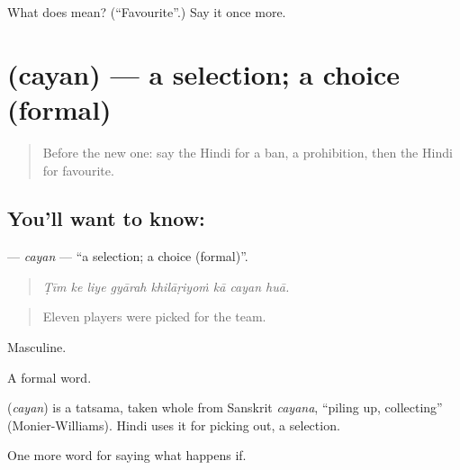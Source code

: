 \begin{tcolorbox}[breakable,colback=teal!4,colframe=teal!35!black,title={Before you move on}]
What does  mean? (\textquotedblleft{}Favourite\textquotedblright{}.) Say it once more.
\end{tcolorbox}
\section[\texorpdfstring{\hi{चयन} (cayan)}{चयन (cayan)}]{ (cayan) — a selection; a choice (formal)}

\label{lesson:HI-C550-cayan}



\begin{quote}
Before the new one: say the Hindi for a ban, a prohibition, then the Hindi for favourite.
\end{quote}

\subsection*{You'll want to know: }
\textbf{} — \emph{cayan} — \textquotedblleft{}a selection; a choice (formal)\textquotedblright{}.

\begin{quote}
       
\end{quote}

\begin{quote}
\emph{Ṭīm ke liye gyārah khilāṛiyoṁ kā cayan huā.}
\end{quote}

\begin{quote}
Eleven players were picked for the team.
\end{quote}

Masculine.

A formal word.

\begin{cousinweb}
\textbf{} (\emph{cayan}) is a tatsama, taken whole from Sanskrit \emph{cayana}, \textquotedblleft{}piling up, collecting\textquotedblright{} (Monier-Williams). Hindi uses it for picking out, a selection.
\end{cousinweb}

\begin{grammarlens}[title={What you've built}]
One more word for saying what happens if.
\end{grammarlens}

